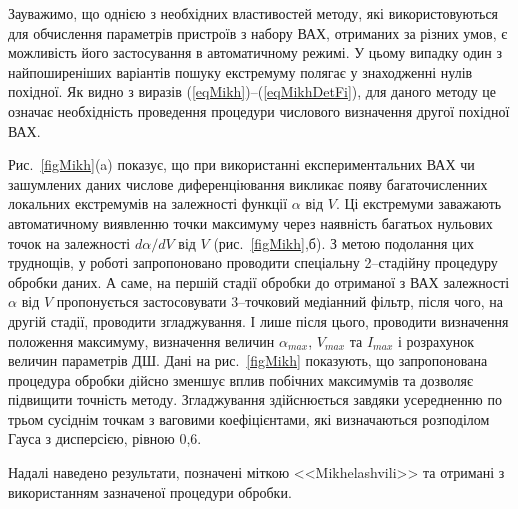 Зауважимо, що однією з необхідних властивостей методу, які використовуються для обчислення параметрів пристроїв з набору ВАХ, отриманих за різних умов, є можливість його застосування в автоматичному режимі.
У цьому випадку один з найпоширеніших варіантів пошуку екстремуму полягає у знаходженні нулів похідної.
Як видно з виразів (\ref{eqMikh})--(\ref{eqMikhDetFi}), для даного методу це означає необхідність проведення процедури числового визначення другої похідної ВАХ.


Рис.~\ref{figMikh}(a) показує, що при використанні експериментальних ВАХ чи зашумлених даних числове диференціювання викликає появу багаточисленних локальних екстремумів на залежності функції $\alpha$ від $V$.
Ці екстремуми заважають автоматичному виявленню точки максимуму через наявність багатьох нульових точок на залежності $d\alpha/dV$ від $V$ (рис.~\ref{figMikh},б).
З метою подолання цих труднощів, у роботі запропоновано проводити спеціальну 2--стадійну процедуру обробки даних.
А саме, на першій стадії обробки до отриманої з ВАХ залежності $\alpha$ від $V$ пропонується застосовувати 3--точковий медіанний фільтр, після чого, на другій стадії, проводити згладжування.
І лише після цього, проводити визначення положення максимуму, визначення величин $\alpha_{max}$, $V_{max}$  та $I_{max}$ і розрахунок величин параметрів ДШ.
Дані на рис.~\ref{figMikh} показують, що запропонована процедура обробки дійсно зменшує вплив побічних максимумів та дозволяє підвищити точність методу.
Згладжування здійснюється завдяки усередненню по трьом сусіднім точкам з ваговими коефіцієнтами, які визначаються розподілом Гауса з дисперсією, рівною 0,6.

Надалі наведено результати, позначені міткою <<Mikhelashvili>> та отримані з використанням зазначеної процедури обробки.


